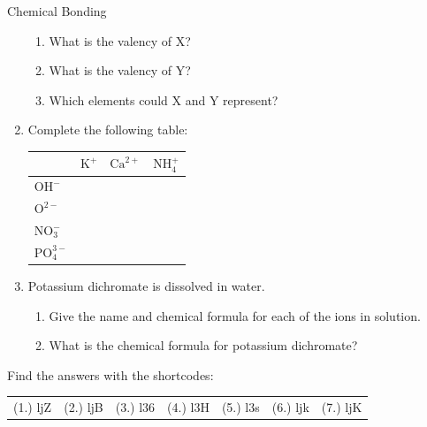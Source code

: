 \begin{eocexercises}{Chemical Bonding}
\begin{enumerate}[noitemsep, label=\textbf{\arabic*}. ]
 \label{m38689*id148261}\begin{enumerate}[noitemsep, label=\textbf{\alph*}. ] 
            \label{m38689*uid181}\item What is the valency of $\text{X}$?
\label{m38689*uid182}\item What is the valency of $\text{Y}$?
\label{m38689*uid183}\item Which elements could $\text{X}$ and $\text{Y}$ represent?
\end{enumerate}
\item Complete the following table:
\begin{table}[H]
\begin{center}
 \begin{tabular}{|l|l|l|l|} \hline
  & \textbf{$\text{K}^{+}$} & \textbf{$\text{Ca}^{2+}$} & \textbf{$\text{NH}_{4}^{+}$} \\ \hline
\textbf{$\text{OH}^{-}$} & & & \\ \hline   
\textbf{$\text{O}^{2-}$} & & & \\ \hline   
\textbf{$\text{NO}_{3}^{-}$} & & & \\ \hline   
\textbf{$\text{PO}_{4}^{3-}$} & & & \\ \hline   
 \end{tabular}
\end{center}
\end{table}
              \label{m38689*uid185}\item Potassium dichromate is dissolved in water.
\label{m38689*id148361}\begin{enumerate}[noitemsep, label=\textbf{\alph*}. ] 
            \label{m38689*uid186}\item Give the name and chemical formula for each of the ions in solution.
\label{m38689*uid187}\item What is the chemical formula for potassium dichromate?
\end{enumerate}
                \end{enumerate}
  \label{m38689**end}
  \label{6cd7661dc7a31822d94f8eef4ac8e3a5**end}
\practiceinfo
\par {} Find the answers with the shortcodes:
 \par \begin{tabular}[h]{cccccc}
 (1.) ljZ  &  (2.) ljB  &  (3.) l36  &  (4.) l3H  &  (5.) l3s  &  (6.) ljk  &  (7.) ljK  & \end{tabular}
\end{eocexercises}
